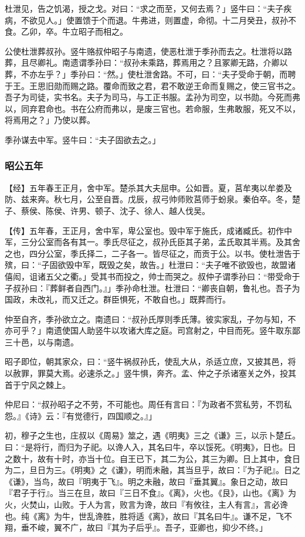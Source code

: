 \documentclass[]{article}
\begin{document}
杜泄见，告之饥渴，授之戈。对曰：``求之而至，又何去焉？」竖牛曰：``夫子疾病，不欲见人。」使置馈于个而退。牛弗进，则置虚，命彻。十二月癸丑，叔孙不食。乙卯，卒。牛立昭子而相之。

公使杜泄葬叔孙。竖牛赂叔仲昭子与南遗，使恶杜泄于季孙而去之。杜泄将以路葬，且尽卿礼。南遗谓季孙曰：``叔孙未乘路，葬焉用之？且冢卿无路，介卿以葬，不亦左乎？」季孙曰：``然。」使杜泄舍路。不可，曰：``夫子受命于朝，而聘于王。王思旧勋而赐之路。覆命而致之君，君不敢逆王命而复赐之，使三官书之。吾子为司徒，实书名。夫子为司马，与工正书服。孟孙为司空，以书勋。今死而弗以，同弃君命也。书在公府而弗以，是废三官也。若命服，生弗敢服，死又不以，将焉用之？」乃使以葬。

季孙谋去中军。竖牛曰：``夫子固欲去之。」

\hypertarget{header-n2443}{%
\subsubsection{昭公五年}\label{header-n2443}}

【经】五年春王正月，舍中军。楚杀其大夫屈申。公如晋。夏，莒牟夷以牟娄及防、兹来奔。秋七月，公至自晋。戊辰，叔弓帅师败莒师于蚡泉。秦伯卒。冬，楚子、蔡侯、陈侯、许男、顿子、沈子、徐人、越人伐吴。

【传】五年春，王正月，舍中军，卑公室也。毁中军于施氏，成诸臧氏。初作中军，三分公室而各有其一。季氏尽征之，叔孙氏臣其子弟，孟氏取其半焉。及其舍之也，四分公室，季氏择二，二子各一。皆尽征之，而贡于公。以书。使杜泄告于殡，曰：``子固欲毁中军，既毁之矣，故告。」杜泄曰：``夫子唯不欲毁也，故盟诸僖闳，诅诸五父之衢。」受其书而投之，帅士而哭之。叔仲子谓季孙曰：``带受命于子叔孙曰：『葬鲜者自西门。』」季孙命杜泄。杜泄曰：``卿丧自朝，鲁礼也。吾子为国政，未改礼，而又迁之。群臣惧死，不敢自也。」既葬而行。

仲至自齐，季孙欲立之。南遗曰：``叔孙氏厚则季氏薄。彼实家乱，子勿与知，不亦可乎？」南遗使国人助竖牛以攻诸大库之庭。司宫射之，中目而死。竖牛取东鄙三十邑，以与南遗。

昭子即位，朝其家众，曰：``竖牛祸叔孙氏，使乱大从，杀适立庶，又披其邑，将以赦罪，罪莫大焉。必速杀之。」竖牛惧，奔齐。孟、仲之子杀诸塞关之外，投其首于宁风之棘上。

仲尼曰：``叔孙昭子之不劳，不可能也。周任有言曰：『为政者不赏私劳，不罚私怨。』《诗》云：『有觉德行，四国顺之。』」

初，穆子之生也，庄叔以《周易》筮之，遇《明夷》三之《谦》三，以示卜楚丘。曰：``是将行，而归为子祀。以谗人入，其名曰牛，卒以馁死。《明夷》，日也。日之数十，故有十时，亦当十位。自王已下，其二为公，其三为卿。日上其中，食日为二，旦日为三。《明夷》之《谦》，明而未融，其当旦乎，故曰：『为子祀』。日之《谦》，当鸟，故曰『明夷于飞』。明之未融，故曰『垂其翼』。象日之动，故曰『君子于行』。当三在旦，故曰『三日不食』。《离》，火也。《艮》，山也。《离》为火，火焚山，山败。于人为言，败言为谗，故曰『有攸往，主人有言』，言必谗也。纯《离》为牛，世乱谗胜，胜将适《离》，故曰『其名曰牛』。谦不足，飞不翔，垂不峻，翼不广，故曰『其为子后乎』。吾子，亚卿也，抑少不终。」
\end{document}
